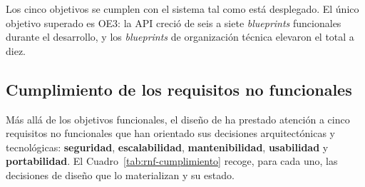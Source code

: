 Los cinco objetivos se cumplen con el sistema tal como está desplegado.  El
único objetivo superado es OE3: la \ac{API} creció de seis a siete
\emph{blueprints} funcionales durante el desarrollo, y los \emph{blueprints}
de organización técnica elevaron el total a diez.

\subsection{Cumplimiento de los requisitos no funcionales}
\label{sec:rnf-cumplimiento}

Más allá de los objetivos funcionales, el diseño de \dataqual ha prestado
atención a cinco requisitos no funcionales que han orientado sus decisiones
arquitectónicas y tecnológicas: \textbf{seguridad}, \textbf{escalabilidad},
\textbf{mantenibilidad}, \textbf{usabilidad} y \textbf{portabilidad}.  El
Cuadro~\ref{tab:rnf-cumplimiento} recoge, para cada uno, las decisiones de
diseño que lo materializan y su estado.

